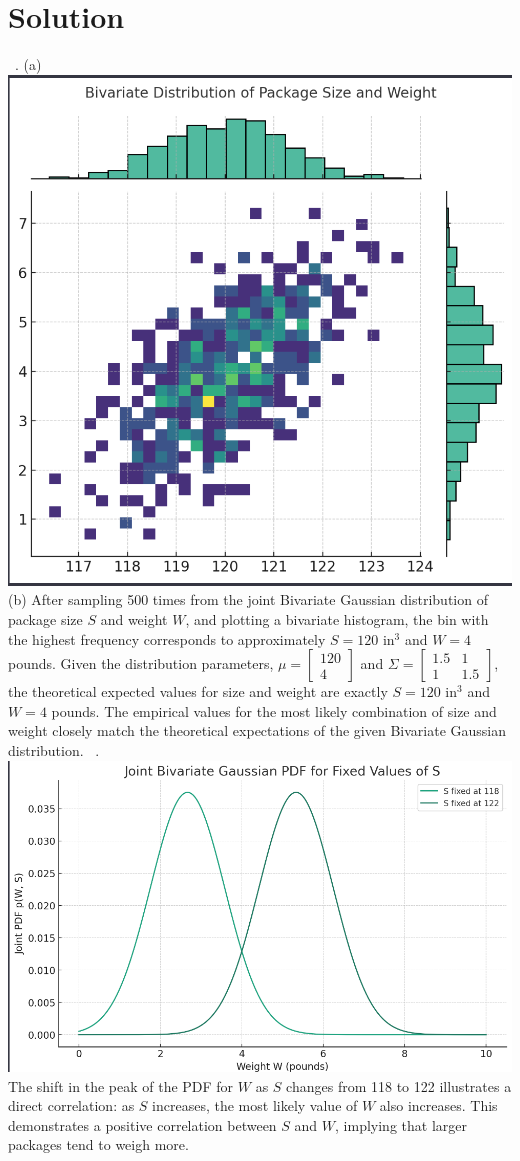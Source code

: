 \documentclass{harvardml}
\theoremstyle{definition}
\theoremstyle{plain}
\newenvironment{solution}
  {\color{blue}\section*{Solution}}
{}
\begin{document}
\begin{solution}
	\ . (a) \includegraphics[width=0.5\linewidth]{a.png}
        \newline (b) After sampling 500 times from the joint Bivariate Gaussian distribution of package size \(S\) and weight \(W\), and plotting a bivariate histogram, the bin with the highest frequency corresponds to approximately \(S = 120\) in\(^3\) and \(W = 4\) pounds. Given the distribution parameters, \(\mu = \begin{bmatrix} 120 \\ 4 \end{bmatrix}\) and \(\Sigma = \begin{bmatrix} 1.5 & 1 \\ 1 & 1.5 \end{bmatrix}\), the theoretical expected values for size and weight are exactly \(S = 120\) in\(^3\) and \(W = 4\) pounds. The empirical values for the most likely combination of size and weight closely match the theoretical expectations of the given Bivariate Gaussian distribution.
        \ . \includegraphics[width=0.5\linewidth]{b.png} The shift in the peak of the PDF for \(W\) as \(S\) changes from 118 to 122 illustrates a direct correlation: as \(S\) increases, the most likely value of \(W\) also increases. This demonstrates a positive correlation between \(S\) and \(W\), implying that larger packages tend to weigh more.

\end{solution}
\end{document}
